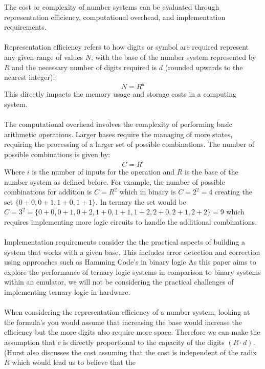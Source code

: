 \documentclass[12pt]{article}
\begin{document}
The cost or complexity of number systems can be evaluated through representation efficiency,
computational overhead, and implementation requirements.\\
\\
Representation efficiency refers to how digits or symbol are required represent any given range of values $N$, with the base of the number system represented 
by $R$ and the necessary number of digits required is $d$ (rounded upwards to the nearest integer):
\begin{equation}
  \label{eq:1}
  N = R^{d}
\end{equation}
This directly impacts the memory usage and storage costs in a computing system.\\
\\
The computational overhead involves the complexity of performing basic arithmetic operations. Larger bases require the managing of more states, requiring the 
processing of a larger set of possible combinations. The number of possible combinations is given by:
\begin{equation}
  C = R^{i}
\end{equation}
Where $i$ is the number of inputs for the operation and $R$ is the base of the number system as defined before. For example, the number of possible combinations 
for addition is $C = R^{2}$ which in binary is $C = 2^{2} = 4$ creating the set $\{0+0, 0+1, 1+0, 1+1\}$. 
In ternary the set would be $C = 3^{2} = \{0+0, 0+1, 0+2, 1+0, 1+1, 1+2, 2+0, 2+1, 2+2\} = 9$ which requires implementing more logic circuits to handle the 
additional combinations.\\
\\
Implementation requirements consider the the practical aspects of building a system that works with a given base. This includes 
error detection and correction using approaches such as Hamming Code's in binary logic %
As this paper aims to explore the performance of ternary logic systems in comparison to binary systems within an emulator, we will not be considering 
the practical challenges of implementing ternary logic in hardware.\\
\\
When considering the representation efficiency of a number system, 
looking at the formula's you would assume that increasing the base would increase the efficiency but the more digits also
require more space. Therefore we can make the assumption that $c$ is directly proportional to the capacity of the digits $(R \cdot d)$.
(Hurst also discusses the cost assuming that the cost is independent of the radix $R$ which would lead us to believe that the 
\end{document}
